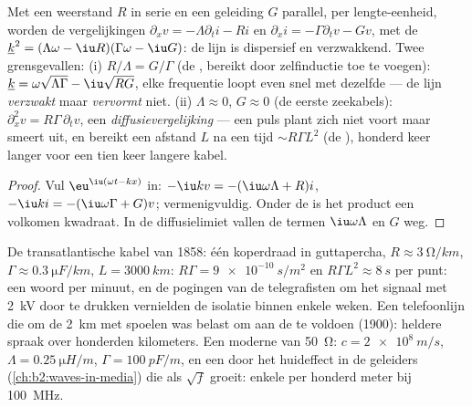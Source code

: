 \begin{proposition}\label{prop:b2:dispersion-wave-packets:lossy}
Met een weerstand $R$ in serie en een geleiding $G$ parallel, per
lengte-eenheid, worden de vergelijkingen
$\partial_xv = -\Lambda\partial_ti - Ri$ en
$\partial_xi =
-\Gamma\partial_tv - Gv$, met de 
$\underline k^2 = (\Lambda\omega -
\iu R)(\Gamma\omega - \iu G)$: de lijn is
dispersief en verzwakkend. Twee grensgevallen: (i) $R/\Lambda = G/\Gamma$
(de , bereikt door zelfinductie toe te voegen):
$\underline k = \omega\sqrt{\Lambda\Gamma} - \iu\sqrt{RG}$, elke frequentie
loopt even snel met dezelfde  --- de lijn \emph{verzwakt} maar
\emph{vervormt} niet. (ii) $\Lambda \approx 0$, $G \approx 0$ (de eerste
zeekabels): $\partial_x^2v = R\Gamma\,\partial_tv$, een
\emph{diffusievergelijking} --- een puls plant zich niet voort maar smeert
uit, en bereikt een afstand $L$ na een tijd $\sim R\Gamma L^2$ (de
), honderd keer langer voor een tien keer langere
kabel.
\end{proposition}

\begin{proof}
Vul $\eu^{\iu(\omega t - kx)}$ in: $-\iu kv = -(\iu\omega\Lambda + R)i$,
$-\iu ki = -(\iu
\omega\Gamma + G)v$; vermenigvuldig. Onder de  is het product een volkomen kwadraat. In de diffusielimiet
vallen de termen $\iu\omega\Lambda$ en $G$ weg.
\end{proof}

\begin{example}\label{ex:b2:dispersion-wave-packets:cables}
De transatlantische kabel van 1858: één koperdraad in guttapercha,
$R \approx \qty{3}{\ohm/km}$, $\Gamma \approx \qty{0.3}{\micro F/km}$,
$L = \qty{3000}{km}$: $R\Gamma = \qty{9e-10}{s/m^2}$ en
$R\Gamma L^2 \approx \qty{8}{s}$ per punt: een woord per minuut, en de
pogingen van de telegrafisten om het signaal met \qty{2}{kV} door te drukken
vernielden de isolatie binnen enkele weken. Een telefoonlijn die om de
\qty{2}{km} met spoelen was belast om aan de  te
voldoen (1900): heldere spraak over honderden kilometers. Een moderne
 van \qty{50}{\ohm}: $c = \qty{2e8}{m/s}$,
$\Lambda = \qty{0.25}{\micro H/m}$, $\Gamma =
\qty{100}{pF/m}$, en een
 door het huideffect in de geleiders
(\cref{ch:b2:waves-in-media}) die als $\sqrt f$ groeit: enkele  per
honderd meter bij \qty{100}{MHz}.
\end{example}

